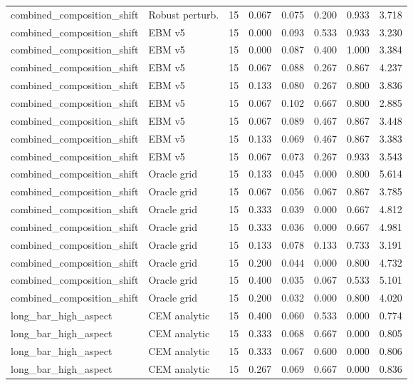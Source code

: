 {\begin{longtable}{llrrrrrr}
combined\_composition\_shift & Robust perturb. & 15 & 0.067 & 0.075 & 0.200 & 0.933 & 3.718 \\
combined\_composition\_shift & EBM v5 & 15 & 0.000 & 0.093 & 0.533 & 0.933 & 3.230 \\
combined\_composition\_shift & EBM v5 & 15 & 0.000 & 0.087 & 0.400 & 1.000 & 3.384 \\
combined\_composition\_shift & EBM v5 & 15 & 0.067 & 0.088 & 0.267 & 0.867 & 4.237 \\
combined\_composition\_shift & EBM v5 & 15 & 0.133 & 0.080 & 0.267 & 0.800 & 3.836 \\
combined\_composition\_shift & EBM v5 & 15 & 0.067 & 0.102 & 0.667 & 0.800 & 2.885 \\
combined\_composition\_shift & EBM v5 & 15 & 0.067 & 0.089 & 0.467 & 0.867 & 3.448 \\
combined\_composition\_shift & EBM v5 & 15 & 0.133 & 0.069 & 0.467 & 0.867 & 3.383 \\
combined\_composition\_shift & EBM v5 & 15 & 0.067 & 0.073 & 0.267 & 0.933 & 3.543 \\
combined\_composition\_shift & Oracle grid & 15 & 0.133 & 0.045 & 0.000 & 0.800 & 5.614 \\
combined\_composition\_shift & Oracle grid & 15 & 0.067 & 0.056 & 0.067 & 0.867 & 3.785 \\
combined\_composition\_shift & Oracle grid & 15 & 0.333 & 0.039 & 0.000 & 0.667 & 4.812 \\
combined\_composition\_shift & Oracle grid & 15 & 0.333 & 0.036 & 0.000 & 0.667 & 4.981 \\
combined\_composition\_shift & Oracle grid & 15 & 0.133 & 0.078 & 0.133 & 0.733 & 3.191 \\
combined\_composition\_shift & Oracle grid & 15 & 0.200 & 0.044 & 0.000 & 0.800 & 4.732 \\
combined\_composition\_shift & Oracle grid & 15 & 0.400 & 0.035 & 0.067 & 0.533 & 5.101 \\
combined\_composition\_shift & Oracle grid & 15 & 0.200 & 0.032 & 0.000 & 0.800 & 4.020 \\
long\_bar\_high\_aspect & CEM analytic & 15 & 0.400 & 0.060 & 0.533 & 0.000 & 0.774 \\
long\_bar\_high\_aspect & CEM analytic & 15 & 0.333 & 0.068 & 0.667 & 0.000 & 0.805 \\
long\_bar\_high\_aspect & CEM analytic & 15 & 0.333 & 0.067 & 0.600 & 0.000 & 0.806 \\
long\_bar\_high\_aspect & CEM analytic & 15 & 0.267 & 0.069 & 0.667 & 0.000 & 0.836 \\

\end{longtable}}
